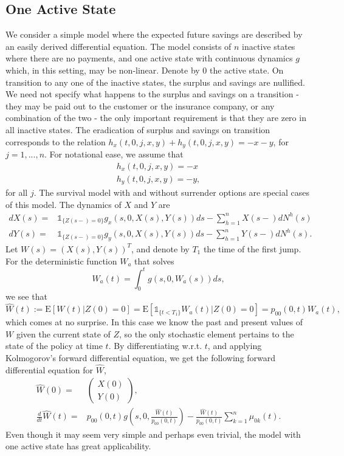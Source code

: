 \documentclass[12pt]{article}
\newcommand{\E}{\text{E}}
\newcommand{\indic}[1]{\mathds{1}_{ \{ #1 \} }}
\theoremstyle{my_thm}
\begin{document}
\fi
\subsection{One Active State}
We consider a simple model where the expected future savings are described by an easily derived differential equation. The model consists of $n$ inactive states where there are no payments, and one active state with continuous dynamics $g$ which, in this setting, may be non-linear. Denote by $0$ the active state. On transition to any one of the inactive states, the surplus and savings are nullified. We need not specify what happens to the surplus and savings on a transition - they may be paid out to the customer or the insurance company, or any combination of the two - the only important requirement is that they are zero in all inactive states. The eradication of surplus and savings on transition corresponds to the relation $h_x(t,0,j,x,y)+h_y(t,0,j,x,y)=-x-y$, for $j=1,...,n$. For notational ease, we assume that 
\begin{gather*}
h_x(t,0,j,x,y)=-x
\\
h_y(t,0,j,x,y)=-y,
\end{gather*}
for all $j$. The survival model with and without surrender options are special cases of this model.  The dynamics of $X$ and $Y$ are
\begin{align*}
dX(s)=& \indic{Z(s-)=0} g_x(s,0,X(s),Y(s))ds - \sum_{h=1}^n X(s-)dN^h(s)
\\
dY(s)=& \indic{Z(s-)=0} g_y(s,0,X(s),Y(s))ds - \sum_{h=1}^n Y(s-)dN^h(s).
\end{align*}
Let $W(s)=(X(s),Y(s))^T$, and denote by $T_1$ the time of the first jump. For the deterministic function $W_a$ that solves
$$
W_a(t)=\int_0^t g(s,0,W_a(s)) ds,
$$
we see that
$$
\hat{W}(t):=\E[W(t)|Z(0)=0] = \E [  \indic{t<T_1} W_a(t)|Z(0)=0]  = p_{00}(0,t) W_a(t),
$$
which comes at no surprise. In this case we know the past and present values of $W$ given the current state of $Z$, so the only stochastic element pertains to the state of the policy at time $t$. By differentiating w.r.t. $t$, and applying Kolmogorov's forward differential equation, we get the following forward differential equation for $\hat{W}$,
\begin{align*}
\hat{W}(0)=&\begin{pmatrix}
X(0)\\
Y(0)
\end{pmatrix},
\\
\frac{d}{dt}\hat{W}(t)=&p_{00}(0,t) g \left( s,0,\frac{\hat{W}(t)}{p_{00}(0,t)}\right)
-
\frac{\hat{W}(t)}{p_{00}(0,t)}\sum_{k=1}^n \mu_{0k}(t).
\end{align*}
Even though it may seem very simple and perhaps even trivial, the model with one active state has great applicability.
\end{document}

